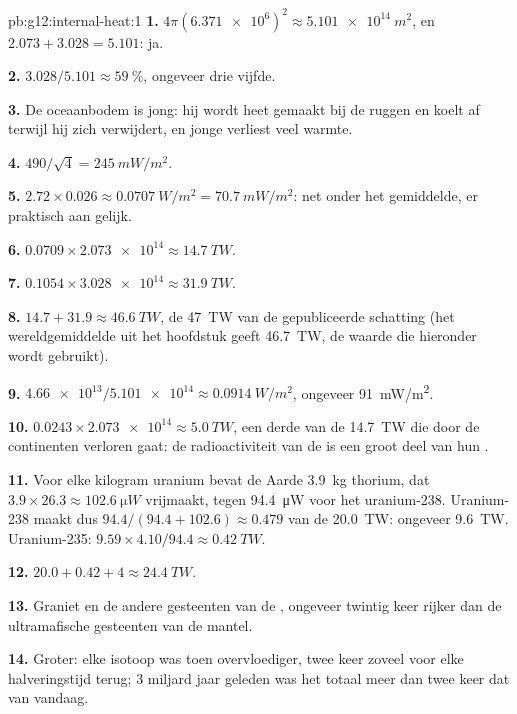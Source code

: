 \begin{solution}{pb:g12:internal-heat:1}
\textbf{1.} $4\pi (\num{6.371e6})^2 \approx \qty{5.101e14}{m^2}$, en
$2.073 + 3.028 = 5.101$: ja.

\textbf{2.} $3.028/5.101 \approx \qty{59}{\percent}$, ongeveer drie vijfde.

\textbf{3.} De oceaanbodem is jong: hij wordt heet gemaakt bij de ruggen en
koelt af terwijl hij zich verwijdert, en jonge  verliest veel warmte.

\textbf{4.} $490/\sqrt{4} = \qty{245}{mW/m^2}$.

\textbf{5.} $2.72 \times 0.026 \approx \qty{0.0707}{W/m^2} =
\qty{70.7}{mW/m^2}$: net onder het gemiddelde, er praktisch aan gelijk.

\textbf{6.} $0.0709 \times \num{2.073e14} \approx \qty{14.7}{TW}$.

\textbf{7.} $0.1054 \times \num{3.028e14} \approx \qty{31.9}{TW}$.

\textbf{8.} $14.7 + 31.9 \approx \qty{46.6}{TW}$, de \qty{47}{TW} van de
gepubliceerde schatting (het wereldgemiddelde uit het hoofdstuk geeft \qty{46.7}{TW}, de
waarde die hieronder wordt gebruikt).

\textbf{9.} $\num{4.66e13}/\num{5.101e14} \approx \qty{0.0914}{W/m^2}$,
ongeveer \qty{91}{mW/m^2}.

\textbf{10.} $0.0243 \times \num{2.073e14} \approx \qty{5.0}{TW}$, een derde van
de \qty{14.7}{TW} die door de continenten verloren gaat: de radioactiviteit van de
 is een groot deel van hun .

\textbf{11.} Voor elke kilogram uranium bevat de Aarde \qty{3.9}{kg}
thorium, dat $3.9 \times 26.3 \approx \qty{102.6}{\micro W}$ vrijmaakt,
tegen \qty{94.4}{\micro W} voor het uranium-238. Uranium-238 maakt dus
$94.4/(94.4 + 102.6) \approx 0.479$ van de \qty{20.0}{TW}: ongeveer
\qty{9.6}{TW}. Uranium-235: $9.59 \times 4.10/94.4 \approx \qty{0.42}{TW}$.

\textbf{12.} $20.0 + 0.42 + 4 \approx \qty{24.4}{TW}$.

\textbf{13.} Graniet en de andere gesteenten van de , ongeveer
twintig keer rijker dan de ultramafische gesteenten van de mantel.

\textbf{14.} Groter: elke isotoop was toen overvloediger, twee keer zoveel voor
elke halveringstijd terug; 3 miljard jaar geleden was het totaal meer dan twee keer
dat van vandaag.


\end{solution}
